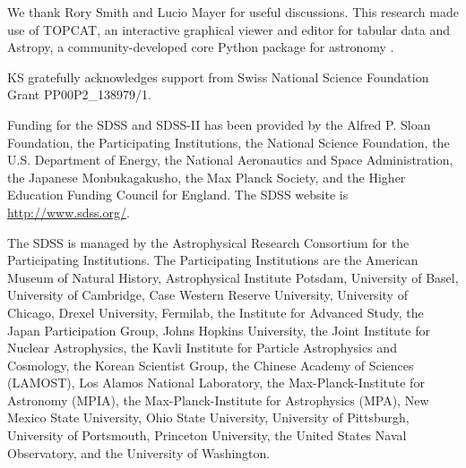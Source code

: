 \documentclass{emulateapj}
\begin{document}
We thank Rory Smith and Lucio Mayer for useful discussions. This research made use of TOPCAT, an interactive graphical viewer and editor for tabular data \citep{tay05} and Astropy, a community-developed core Python package for astronomy \citep{ast13}. 

KS gratefully acknowledges support from Swiss National Science Foundation Grant PP00P2\_138979/1.

Funding for the SDSS and SDSS-II has been provided by the Alfred P. Sloan Foundation, the Participating Institutions, the National Science Foundation, the U.S. Department of Energy, the National Aeronautics and Space Administration, the Japanese Monbukagakusho, the Max Planck Society, and the Higher Education Funding Council for England. The SDSS website is \url{http://www.sdss.org/}.

The SDSS is managed by the Astrophysical Research Consortium for the Participating Institutions. The Participating Institutions are the American Museum of Natural History, Astrophysical Institute Potsdam, University of Basel, University of Cambridge, Case Western Reserve University, University of Chicago, Drexel University, Fermilab, the Institute for Advanced Study, the Japan Participation Group, Johns Hopkins University, the Joint Institute for Nuclear Astrophysics, the Kavli Institute for Particle Astrophysics and Cosmology, the Korean Scientist Group, the Chinese Academy of Sciences (LAMOST), Los Alamos National Laboratory, the Max-Planck-Institute for Astronomy (MPIA), the Max-Planck-Institute for Astrophysics (MPA), New Mexico State University, Ohio State University, University of Pittsburgh, University of Portsmouth, Princeton University, the United States Naval Observatory, and the University of Washington.



\end{document}
